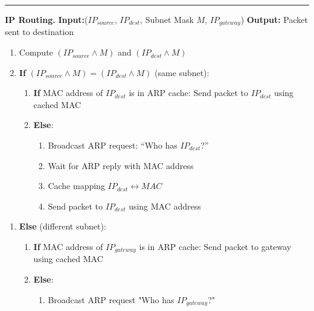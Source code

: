 \documentclass[9pt, a4paper]{extarticle}
\makeatletter
\renewcommand{\hline}{\noalign{\vskip 2px}\hrule\@height\arrayrulewidth\@width\linewidth\noalign{\vskip 2px}}
\makeatother
\begin{document}
\begin{minipage}[t]{0.5\textwidth}
	\hline
	\footnotesize
	\textbf{IP Routing.} \textbf{Input:}($IP_{source}$, $IP_{dest}$, Subnet Mask $M$, $IP_{gateway}$) \; \textbf{Output:} Packet sent to destination\\
	\begin{minipage}[t]{0.48\textwidth}
		\begin{enumerate}[leftmargin=6pt,labelsep=0pt,itemsep=0pt,series=mainenum]
			\item Compute $(IP_{source} \land M)$ and $(IP_{dest} \land M)$
			\item \textbf{If} $(IP_{source} \land M) = (IP_{dest} \land M)$ (same subnet):
			      \begin{enumerate}[leftmargin=4pt,labelsep=0pt,itemsep=0pt]
				      \item \textbf{If} MAC address of $IP_{dest}$ is in ARP cache: Send packet to $IP_{dest}$ using cached MAC
				      \item \textbf{Else}:
				            \begin{enumerate}[leftmargin=4pt,labelsep=0pt,itemsep=0pt]
					            \item Broadcast ARP request: ``Who has $IP_{dest}$?''
					            \item Wait for ARP reply with MAC address
					            \item Cache mapping $IP_{dest} \leftrightarrow MAC$
					            \item Send packet to $IP_{dest}$ using MAC address
				            \end{enumerate}
			      \end{enumerate}
		\end{enumerate}
	\end{minipage}\hfill\vline\hfill
	\begin{minipage}[t]{0.5\textwidth}
		\begin{enumerate}[leftmargin=4pt,labelsep=0pt,itemsep=0pt,resume=mainenum]
			\item \textbf{Else} (different subnet):
			      \begin{enumerate}[leftmargin=4pt,labelsep=0pt,itemsep=0pt]
				      \item \textbf{If} MAC address of $IP_{gateway}$ is in ARP cache: Send packet to gateway using cached MAC
				      \item \textbf{Else}:
				            \begin{enumerate}[leftmargin=4pt,labelsep=0pt,itemsep=0pt]
					            \item Broadcast ARP request "Who has $IP_{gateway}$?"

\end{enumerate}
\end{enumerate}
\end{enumerate}
\end{minipage}
\end{minipage}
\end{document}

